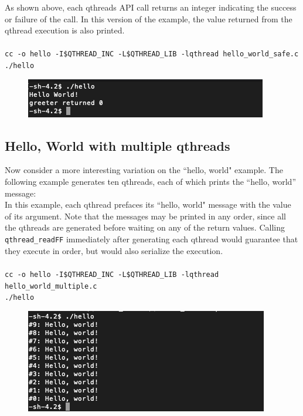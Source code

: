 \documentclass[12pt,fullpage]{article}
\begin{document}
As shown above, each qthreads API call returns an integer indicating the success or failure of the call. In this version of the example, the value returned from the qthread execution is also printed.
\\ \\
{\footnotesize{\tt cc -o hello -I\$QTHREAD\_INC -L\$QTHREAD\_LIB -lqthread hello\_world\_safe.c}}
\\
{\footnotesize{\tt ./hello}}
\begin{figure}[h]
\includegraphics{hello_world_safe.png}
\end{figure}


\subsection{Hello, World with multiple qthreads}

Now consider a more interesting variation on the ``hello, world" example.  The following example generates ten qthreads, each of which prints the ``hello, world'' message:
\\


In this example, each qthread prefaces its ``hello, world" message with the value of its argument.  Note that the messages may be printed in any order, since all the qthreads are generated before waiting on any of the return values.  Calling {\tt qthread\_readFF} immediately after generating each qthread would guarantee that they execute in order, but would also serialize the execution.
\\ \\
{\footnotesize{\tt cc -o hello -I\$QTHREAD\_INC -L\$QTHREAD\_LIB -lqthread hello\_world\_multiple.c}}
\\
{\footnotesize{\tt ./hello}}
\begin{figure}[h]
\includegraphics{hello_world_multiple.png}
\end{figure}
\end{document}
